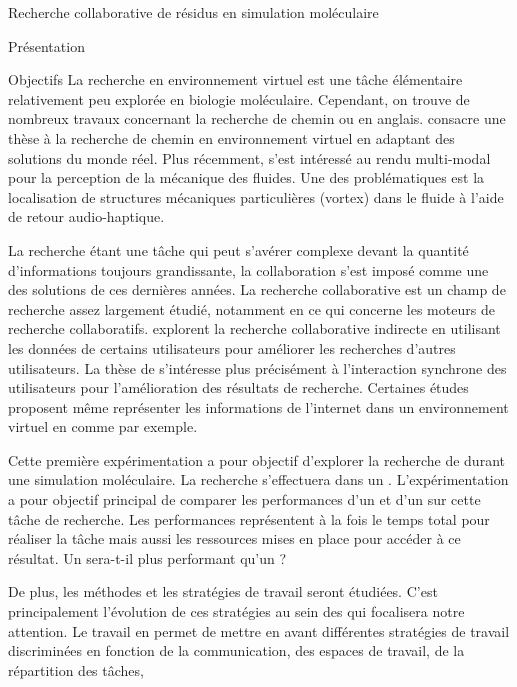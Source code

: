 \documentclass[myfrancais]{mythesis}
\begin{document}
\begin{mychapter}{Recherche collaborative de résidus en simulation moléculaire}
\begin{mysection}{Présentation}
\begin{mysubsection}{Objectifs}
				La recherche en environnement virtuel est une tâche élémentaire relativement peu explorée en biologie moléculaire.
				Cependant, on trouve de nombreux travaux concernant la \og recherche de chemin \fg ou  en anglais.
				 consacre une thèse à la recherche de chemin en environnement virtuel en adaptant des solutions du monde réel.
				Plus récemment,  s'est intéressé au rendu multi-modal pour la perception de la mécanique des fluides.
				Une des problématiques est la localisation de structures mécaniques particulières (vortex) dans le fluide à l'aide de retour audio-haptique.

				La recherche étant une tâche qui peut s'avérer complexe devant la quantité d'informations toujours grandissante, la collaboration s'est imposé comme une des solutions de ces dernières années.
				La recherche collaborative est un champ de recherche assez largement étudié, notamment en ce qui concerne les moteurs de recherche collaboratifs.
				 explorent la recherche collaborative indirecte en utilisant les données de certains utilisateurs pour améliorer les recherches d'autres utilisateurs.
				La thèse de  s'intéresse plus précisément à l'interaction synchrone des utilisateurs pour l'amélioration des résultats de recherche.
				Certaines études proposent même représenter les informations de l'internet dans un environnement virtuel en \myThreeD comme  par exemple.

				Cette première expérimentation a pour objectif d'explorer la recherche de  durant une simulation moléculaire.
				La recherche s'effectuera dans un .
				L'expérimentation a pour objectif principal de comparer les performances d'un  et d'un  sur cette tâche de recherche.
				Les performances représentent à la fois le temps total pour réaliser la tâche mais aussi les ressources mises en place pour accéder à ce résultat.
				Un  sera-t-il plus performant qu'un  ?

				De plus, les méthodes et les stratégies de travail seront étudiées.
				C'est principalement l'évolution de ces stratégies au sein des  qui focalisera notre attention.
				Le travail en  permet de mettre en avant différentes stratégies de travail discriminées en fonction de la communication, des espaces de travail, de la répartition des tâches, \myetc


\end{mysubsection}
\end{mysection}
\end{mychapter}
\end{document}
